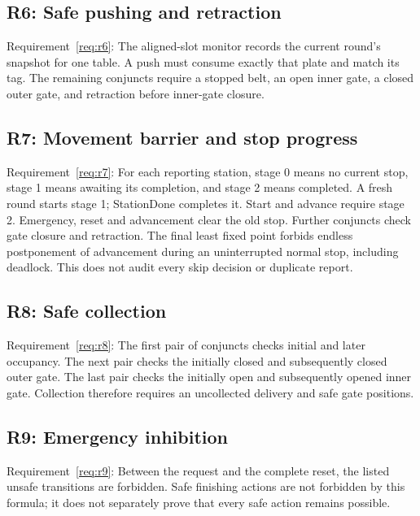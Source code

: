 \documentclass[11pt,a4paper]{article}
\newcommand{\checkedinputs}{../properties}
\begin{document}
\Needspace{\textheight}
\subsection{R6: Safe pushing and retraction}
\label{formula:r6}
Requirement~\ref{req:r6}: The aligned-slot monitor records the current round's snapshot for one table. A push must consume exactly that plate and match its tag. The remaining conjuncts require a stopped belt, an open inner gate, a closed outer gate, and retraction before inner-gate closure.


\Needspace{\textheight}
\subsection{R7: Movement barrier and stop progress}
\label{formula:r7}
Requirement~\ref{req:r7}: For each reporting station, stage 0 means no current stop, stage 1 means awaiting its completion, and stage 2 means completed. A fresh round starts stage 1; StationDone completes it. Start and advance require stage 2. Emergency, reset and advancement clear the old stop. Further conjuncts check gate closure and retraction. The final least fixed point forbids endless postponement of advancement during an uninterrupted normal stop, including deadlock. This does not audit every skip decision or duplicate report.


\Needspace{\textheight}
\subsection{R8: Safe collection}
\label{formula:r8}
Requirement~\ref{req:r8}: The first pair of conjuncts checks initial and later occupancy. The next pair checks the initially closed and subsequently closed outer gate. The last pair checks the initially open and subsequently opened inner gate. Collection therefore requires an uncollected delivery and safe gate positions.


\Needspace{290pt}
\subsection{R9: Emergency inhibition}
\label{formula:r9}
Requirement~\ref{req:r9}: Between the request and the complete reset, the listed unsafe transitions are forbidden. Safe finishing actions are not forbidden by this formula; it does not separately prove that every safe action remains possible.

\end{document}
